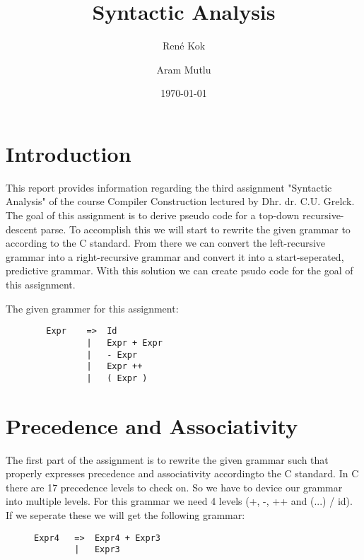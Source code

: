 \documentclass[hidelinks]{uva-inf-article}
\title{Syntactic Analysis}
\author{René Kok}
\author{Aram Mutlu}
\date{\today}
\begin{document}
\maketitle


\section{Introduction}
\begin{flushleft}
\par This report provides information regarding the third assignment 
     "Syntactic Analysis" of the course Compiler Construction lectured by Dhr. dr. C.U. Grelck. 
     The goal of this assignment is to derive pseudo code for a top-down recursive-descent parse. 
     To accomplish this we will start to rewrite the given grammar to according to the C standard. 
     From there we can convert the left-recursive grammar into a right-recursive grammar and convert it into a start-seperated, predictive grammar.
     With this solution we can create psudo code for the goal of this assignment.
     
     The given grammer for this assignment:
     \begin{lstlisting}
        Expr    =>  Id
                |   Expr + Expr
                |   - Expr
                |   Expr ++
                |   ( Expr )
        \end{lstlisting}
\newpage
\section{Precedence and Associativity}
\par The first part of the assignment is to rewrite the given grammar such that properly
expresses precedence and associativity accordingto the C standard. In C there are 17 precedence levels to check on.
So we have to device our grammar into multiple levels. For this grammar we need 4 levels (+, -, ++ and (...) / id). 
If we seperate these we will get the following grammar:
\begin{figure}[h]
\begin{lstlisting}
Expr4   =>  Expr4 + Expr3 
        |   Expr3


\end{lstlisting}
\end{figure}
\end{flushleft}
\end{document}
